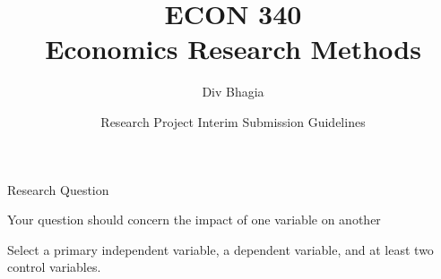 \documentclass{./../Lectures/div_teaching_slides}
\begin{document}
\title{ECON 340 \\ Economics Research Methods}
\author{Div Bhagia}
\date{Research Project Interim Submission Guidelines}

\begin{frame}
\maketitle
\end{frame}





\begin{frame}{Research Question}
\begin{witemize}
\item Your question should concern the impact of one variable on another 
\item Select a primary independent variable, a dependent variable, and at least two control variables.
\end{witemize}
\begin{center}
  \end{center} 
\end{frame}
\end{document}
